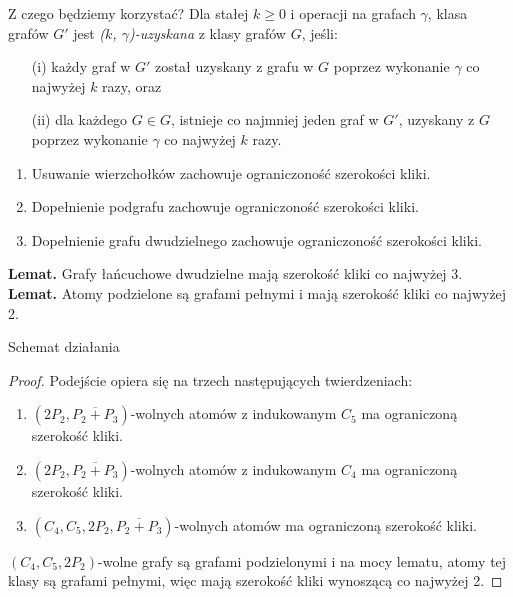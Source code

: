 \documentclass[polish]{beamer}
\begin{document}
\begin{frame}{Z czego będziemy korzystać?}
    Dla stałej $k \geq 0$ i operacji na grafach $\gamma$, klasa grafów $G'$ jest \emph{($k$, $\gamma$)-uzyskana} z klasy grafów $G$, jeśli:
    \begin{itemize}
        \item[(i)] każdy graf w $G'$ został uzyskany z grafu w $G$ poprzez wykonanie $\gamma$ co najwyżej $k$ razy, oraz
        \item[(ii)] dla każdego $G \in G$, istnieje co najmniej jeden graf w $G'$, uzyskany z $G$ poprzez wykonanie $\gamma$ co najwyżej $k$ razy.
    \end{itemize}
    \begin{enumerate}
        \item Usuwanie wierzchołków zachowuje ograniczoność szerokości kliki.
        \item Dopełnienie podgrafu zachowuje ograniczoność szerokości kliki.
        \item Dopełnienie grafu dwudzielnego zachowuje ograniczoność szerokości kliki.
    \end{enumerate}

    \textbf{Lemat.} Grafy łańcuchowe dwudzielne mają szerokość kliki co najwyżej 3.\\
    \textbf{Lemat.} Atomy podzielone są grafami pełnymi i mają szerokość kliki co najwyżej 2.
\end{frame}

\begin{frame}{Schemat działania}
    \begin{proof}
        \renewcommand{\qedsymbol}{}
        Podejście opiera się na trzech następujących twierdzeniach:
        \begin{enumerate}
            \item $(2P_2, \overline{P_2 + P_3})$-wolnych atomów z indukowanym $C_5$ ma ograniczoną szerokość kliki.
            \item $(2P_2, \overline{P_2 + P_3})$-wolnych atomów z indukowanym $C_4$ ma ograniczoną szerokość kliki.
            \item $(C_4, C_5, 2P_2, \overline{P_2 + P_3})$-wolnych atomów ma ograniczoną szerokość kliki.
        \end{enumerate}
        $(C_4, C_5, 2P_2)$-wolne grafy są grafami podzielonymi i na mocy lematu, atomy tej klasy są grafami pełnymi, więc mają szerokość kliki wynoszącą co najwyżej 2.    
    \end{proof}
\end{frame}
\end{document}
